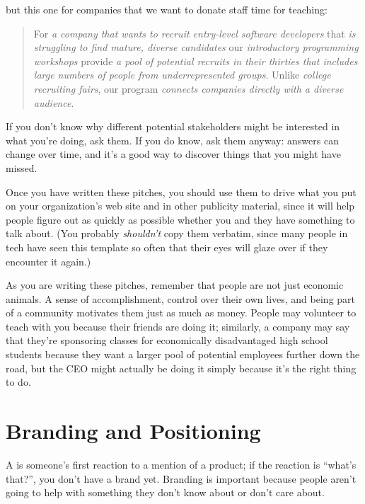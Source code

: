 \noindent
but this one for companies that we want to donate staff time for
teaching:

\begin{quote}

  For \emph{a company that wants to recruit entry-level software
    developers} that \emph{is struggling to find mature, diverse
    candidates} our \emph{introductory programming workshops} provide
  \emph{a pool of potential recruits in their thirties that includes
    large numbers of people from underrepresented groups}. Unlike
  \emph{college recruiting fairs}, our program \emph{connects
    companies directly with a diverse audience}.

\end{quote}

If you don't know why different potential stakeholders might be
interested in what you're doing, ask them. If you do know, ask them
anyway: answers can change over time, and it's a good way to discover
things that you might have missed.

Once you have written these pitches, you should use them to drive what
you put on your organization's web site and in other publicity
material, since it will help people figure out as quickly as possible
whether you and they have something to talk about.  (You probably
\emph{shouldn't} copy them verbatim, since many people in tech have
seen this template so often that their eyes will glaze over if they
encounter it again.)

As you are writing these pitches, remember that people are not just
economic animals. A sense of accomplishment, control over their own
lives, and being part of a community motivates them just as much as
money. People may volunteer to teach with you because their friends
are doing it; similarly, a company may say that they're sponsoring
classes for economically disadvantaged high school students because
they want a larger pool of potential employees further down the road,
but the CEO might actually be doing it simply because it's the right
thing to do.

\section{Branding and Positioning}\label{s:marketing-branding}

A  is someone's first reaction to a mention
of a product; if the reaction is ``what's that?'', you don't have a
brand yet.  Branding is important because people aren't going to help
with something they don't know about or don't care about.

